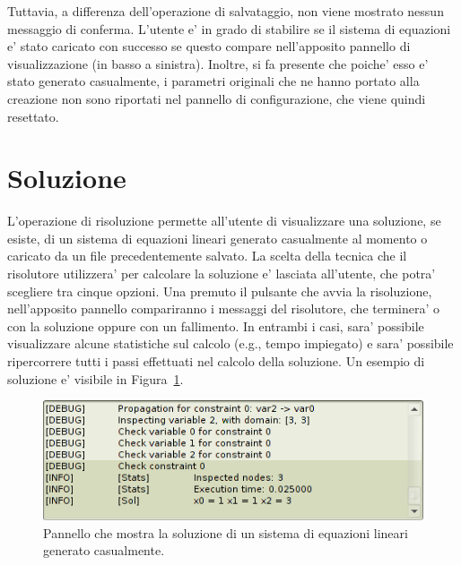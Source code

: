 \documentclass{article}
\begin{document}
Tuttavia, a differenza dell'operazione di salvataggio, non viene mostrato nessun messaggio di conferma. L'utente e' in grado di stabilire se il sistema di equazioni e' stato caricato con successo se questo compare nell'apposito pannello di visualizzazione (in basso a sinistra). Inoltre, si fa presente che poiche' esso e' stato generato casualmente, i parametri originali che ne hanno portato alla creazione non sono riportati nel pannello di configurazione, che viene quindi resettato.

\section{Soluzione}
\label{sec:soluzione}

L'operazione di risoluzione permette all'utente di visualizzare una soluzione, se esiste, di un sistema di equazioni lineari generato casualmente al momento o caricato da un file precedentemente salvato. La scelta della tecnica che il risolutore utilizzera' per calcolare la soluzione e' lasciata all'utente, che potra' scegliere tra cinque opzioni. Una premuto il pulsante che avvia la risoluzione, nell'apposito pannello compariranno i messaggi del risolutore, che terminera' o con la soluzione oppure con un fallimento. In entrambi i casi, sara' possibile visualizzare alcune statistiche sul calcolo (e.g., tempo impiegato) e sara' possibile ripercorrere tutti i passi effettuati nel calcolo della soluzione. Un esempio di soluzione e' visibile in Figura~\ref{fig:soluzione}.

\begin{figure}[htp!]
	\centering
	\includegraphics[scale=.5]{ug-images/solution.png}
	\caption{Pannello che mostra la soluzione di un sistema di equazioni lineari generato casualmente.}
	\label{fig:soluzione}
\end{figure}

\end{document}
